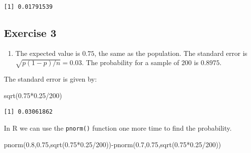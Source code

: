 \documentclass[
  letterpaper,
  DIV=11,
  numbers=noendperiod]{scrreprt}
\newenvironment{Shaded}{\begin{snugshade}}{\end{snugshade}}
\newcommand{\DecValTok}[1]{\textcolor[rgb]{0.68,0.00,0.00}{#1}}
\newcommand{\FloatTok}[1]{\textcolor[rgb]{0.68,0.00,0.00}{#1}}
\newcommand{\FunctionTok}[1]{\textcolor[rgb]{0.28,0.35,0.67}{#1}}
\newcommand{\NormalTok}[1]{\textcolor[rgb]{0.00,0.23,0.31}{#1}}
\newcommand{\SpecialCharTok}[1]{\textcolor[rgb]{0.37,0.37,0.37}{#1}}
\providecommand{\tightlist}{%
  \setlength{\itemsep}{0pt}\setlength{\parskip}{0pt}}\usepackage{longtable,booktabs,array}
\begin{document}
\begin{verbatim}
[1] 0.01791539
\end{verbatim}

\hypertarget{exercise-3-21}{%
\subsection*{Exercise 3}\label{exercise-3-21}}

\begin{blackbox}

\begin{enumerate}
\def\labelenumi{\arabic{enumi}.}
\tightlist
\item
  The expected value is \(0.75\), the same as the population. The
  standard error is \(\sqrt{p(1-p)/n}=0.03\). The probability for a
  sample of \(200\) is \(0.8975\).
\end{enumerate}

\end{blackbox}

The standard error is given by:

\begin{Shaded}
\begin{Highlighting}[numbers=left,,]
\FunctionTok{sqrt}\NormalTok{(}\FloatTok{0.75}\SpecialCharTok{*}\FloatTok{0.25}\SpecialCharTok{/}\DecValTok{200}\NormalTok{)}
\end{Highlighting}
\end{Shaded}

\begin{verbatim}
[1] 0.03061862
\end{verbatim}

In R we can use the \texttt{pnorm()} function one more time to find the
probability.

\begin{Shaded}
\begin{Highlighting}[numbers=left,,]
\FunctionTok{pnorm}\NormalTok{(}\FloatTok{0.8}\NormalTok{,}\FloatTok{0.75}\NormalTok{,}\FunctionTok{sqrt}\NormalTok{(}\FloatTok{0.75}\SpecialCharTok{*}\FloatTok{0.25}\SpecialCharTok{/}\DecValTok{200}\NormalTok{))}\SpecialCharTok{{-}}\FunctionTok{pnorm}\NormalTok{(}\FloatTok{0.7}\NormalTok{,}\FloatTok{0.75}\NormalTok{,}\FunctionTok{sqrt}\NormalTok{(}\FloatTok{0.75}\SpecialCharTok{*}\FloatTok{0.25}\SpecialCharTok{/}\DecValTok{200}\NormalTok{))}
\end{Highlighting}
\end{Shaded}
\end{document}
